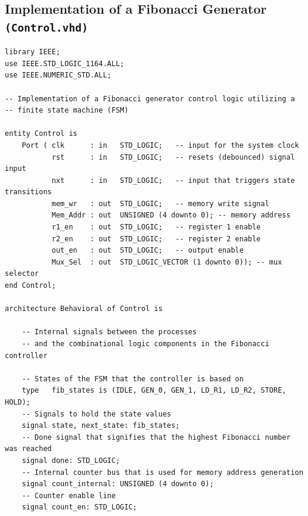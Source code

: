 \documentclass[10pt]{article}
\begin{document}
\subsection{Implementation of a Fibonacci Generator \texttt{(Control.vhd)}}
\begin{verbatim}
library IEEE;
use IEEE.STD_LOGIC_1164.ALL;
use IEEE.NUMERIC_STD.ALL;

-- Implementation of a Fibonacci generator control logic utilizing a 
-- finite state machine (FSM)

entity Control is
    Port ( clk      : in   STD_LOGIC;   -- input for the system clock 
           rst      : in   STD_LOGIC;   -- resets (debounced) signal input
           nxt      : in   STD_LOGIC;   -- input that triggers state transitions
           mem_wr   : out  STD_LOGIC;   -- memory write signal
           Mem_Addr : out  UNSIGNED (4 downto 0); -- memory address
           r1_en    : out  STD_LOGIC;   -- register 1 enable
           r2_en    : out  STD_LOGIC;   -- register 2 enable
           out_en   : out  STD_LOGIC;   -- output enable
           Mux_Sel  : out  STD_LOGIC_VECTOR (1 downto 0)); -- mux selector
end Control;

architecture Behavioral of Control is
    
    -- Internal signals between the processes 
    -- and the combinational logic components in the Fibonacci controller
    
    -- States of the FSM that the controller is based on
    type   fib_states is (IDLE, GEN_0, GEN_1, LD_R1, LD_R2, STORE, HOLD);
    -- Signals to hold the state values
    signal state, next_state: fib_states; 
    -- Done signal that signifies that the highest Fibonacci number was reached
    signal done: STD_LOGIC; 
    -- Internal counter bus that is used for memory address generation
    signal count_internal: UNSIGNED (4 downto 0); 
    -- Counter enable line
    signal count_en: STD_LOGIC; 
\end{verbatim}
\newpage
\end{document}
